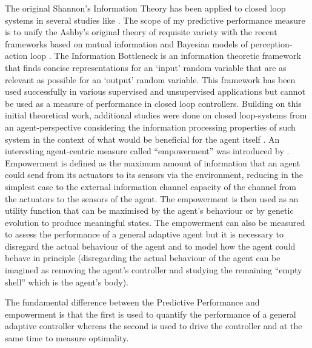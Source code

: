 The original Shannon's Information Theory \citep{Shannon1948} has been applied
to closed loop systems in several studies like \citet{Ashby1956:IntroCybernetics,Tishby1999:InfoBottle,TouchetteLloyd2004:InfoApproachControl}.
The scope of my predictive performance measure is to unify the Ashby's original theory of requisite variety \citet{Ashby1956:IntroCybernetics}
with the recent frameworks based on mutual information \citep{Tishby1999:InfoBottle} and Bayesian models of perception-action loop \citet{Klyubin2004:Organization,Klyubin2005:Empowerment,Klyubin2007:Representation,Klyubin2008:KeepOptions}.
The Information Bottleneck \citep{Tishby1999:InfoBottle} is an information theoretic framework that finds concise
representations for an `input' random variable that are as relevant as possible for an `output' random variable.
This framework has been used successfully in various supervised and unsupervised applications but cannot be used
as a measure of performance in closed loop controllers.
Building on this initial theoretical work, additional studies were done on
closed loop-systems from an agent-perspective considering the information
 processing properties of such system in the context of what would be
 beneficial for the agent itself \citep{Klyubin2007:Representation,Klyubin2008:KeepOptions,Prokopenko2006:EvolveCoordination,
Lungarella2005:MethodsInfo,LungarellaSporns2006:MappingFlow}.
An interesting agent-centric measure called ``empowerment'' was introduced by \citet{Klyubin2005:Empowerment,Klyubin2008:KeepOptions}.
Empowerment is defined as the maximum amount of information that an agent could
send from its actuators to its sensors via the environment, reducing in the simplest
case to the external information channel capacity of the channel from the actuators
to the sensors of the agent.
The empowerment is then used as an utility function that can be maximised
 by the agent's behaviour or by genetic evolution to produce meaningful states.
The empowerment can also be measured  to assess the performance of a general
adaptive agent but it is necessary to disregard the actual behaviour of the agent
and to model how the agent could behave in principle (disregarding the actual
behaviour of the agent can be imagined as removing the agent's controller and
studying the remaining “empty shell” which is the agent's body).

The fundamental difference between the Predictive Performance and empowerment is that
the first is used to quantify the performance of a general adaptive controller
whereas the second is used to drive the controller and at the same time to measure optimality.

